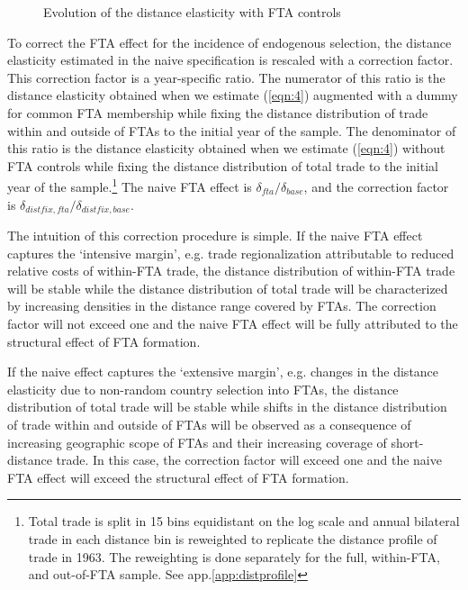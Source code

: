 \documentclass[12pt,twoside,a4paper,notitlepage]{article}
\begin{document}
\begin{figure}[h!]
\caption{Evolution of the distance elasticity with FTA controls \label{fig:ftabench}}
\begin{center}
\setlength{\fboxrule}{1pt} %
\setlength{\fboxsep}{.1in} %
\end{center}
\end{figure} 

To correct the FTA effect for the incidence of endogenous selection, the distance elasticity estimated in the naive  specification is rescaled with a correction factor.
This correction factor is a year-specific ratio.
The numerator of this ratio is the distance elasticity obtained when we estimate (\ref{eqn:4}) augmented with a dummy for common FTA membership while fixing the distance distribution of trade within and outside of FTAs to the initial year of the sample.
The denominator of this ratio is the distance elasticity obtained when we estimate (\ref{eqn:4}) without FTA controls while fixing the distance distribution of total trade to the initial year of the sample.\footnote{Total trade is split in 15 bins equidistant on the log scale and annual bilateral trade in each distance bin is reweighted to replicate the distance profile of trade in 1963.
The reweighting is done separately for the full, within-FTA, and out-of-FTA sample.
See app.\ref{app:distprofile}}
The naive FTA effect is $\delta_{fta}/\delta_{base}$, and the correction factor is $\delta_{distfix,fta}/\delta_{distfix,base}$.

The intuition of this correction procedure is simple.
If the naive FTA effect captures the `intensive margin', e.g.
trade regionalization attributable to reduced relative costs of within-FTA trade, the distance distribution of within-FTA trade will be stable while the distance distribution of total trade will be characterized by increasing densities in the distance range covered by FTAs.
The correction factor will not exceed one and the naive FTA effect will be fully attributed to the structural effect of FTA formation.

If the naive effect captures the `extensive margin', e.g.
changes in the distance elasticity due to non-random country selection into FTAs, the distance distribution of total trade will be stable while shifts in the distance distribution of trade within and outside of FTAs will be observed as a consequence of increasing geographic scope of FTAs and their increasing coverage of short-distance trade.
In this case, the correction factor will exceed one and the naive FTA effect will exceed the structural effect of FTA formation.
\end{document}
